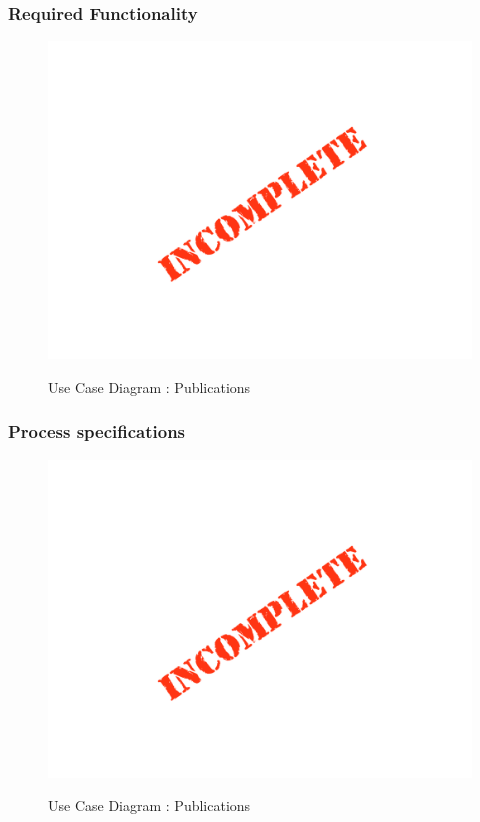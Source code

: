 \documentclass{article}
\begin{document}
	\subsubsection{Required Functionality}

	\begin{figure}[H]
	\includegraphics[width=\textwidth]{images/Incomplete.png}  \\
	\caption{Use Case Diagram : Publications}
	\end{figure}

	\subsubsection{Process specifications}

	\begin{figure}[H]
	\includegraphics[width=\textwidth]{images/Incomplete.png}  \\
	\caption{Use Case Diagram : Publications}
	\end{figure}
\end{document}
